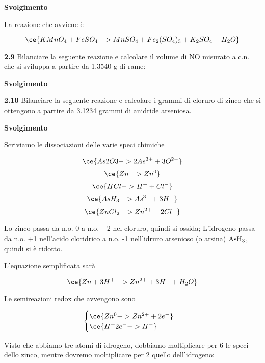 \large\textbf{Svolgimento}\normalsize

\vspace{0.2cm}La reazione che avviene è

$$\ce{KMnO_4 + FeSO_4 -> MnSO_4 + Fe_2(SO_4)_3 + K_2SO_4 + H_2O}$$

\vspace{0.2cm}\textbf{2.9} Bilanciare la seguente reazione e calcolare il volume di NO misurato a c.n. che si sviluppa a
partire da 1.3540 g di rame:

\begin{center}
\end{center}

\large\textbf{Svolgimento}\normalsize

\vspace{0.2cm}

\vspace{0.2cm}\textbf{2.10} Bilanciare la seguente reazione e calcolare i grammi di cloruro di zinco che si ottengono a partire da 3.1234 grammi di anidride arseniosa.

\begin{center}
\end{center}

\large\textbf{Svolgimento}\normalsize

\vspace{0.2cm}Scriviamo le dissociazioni delle varie speci chimiche

$$\ce{As2O3 -> 2As^{3+} + 3O^{2-}}$$
$$\ce{Zn -> Zn^0}$$
$$\ce{HCl -> H^+ + Cl^-}$$
$$\ce{AsH_3 -> As^{3+} + 3H^{-}}$$
$$\ce{ZnCl_2 -> Zn^{2+} + 2Cl^{-}}$$

Lo zinco passa da n.o. 0 a n.o. +2 nel cloruro, quindi si ossida; L'idrogeno passa da n.o. +1 nell'acido cloridrico a n.o. -1 nell'idruro arsenioso (o arsina) $\rm AsH_3$, quindi si è ridotto.

L'equazione semplificata sarà

$$\ce{Zn + 3H^+ -> Zn^{2+} + 3H^- + H_2O }$$

Le semireazioni redox che avvengono sono

$$\begin{cases}
    \ce{Zn^{0} -> Zn^{2+} + 2e^-}\\
    \ce{H^+ 2e^- -> H^-}
\end{cases}$$

Visto che abbiamo tre atomi di idrogeno, dobbiamo moltiplicare per 6 le speci dello zinco, mentre dovremo moltiplicare per 2 quello dell'idrogeno:

